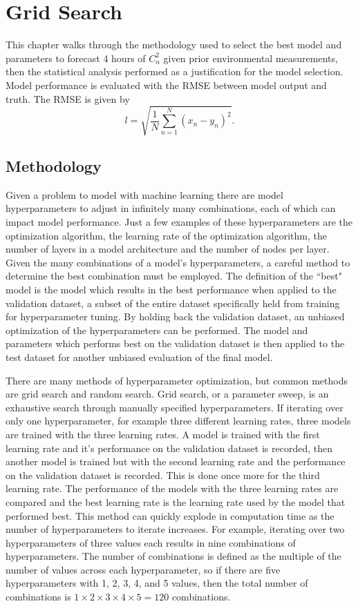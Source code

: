 \chapter{Grid Search}
\label{ch4}
This chapter walks through the methodology used to select the best model and parameters to forecast 4 hours of $C_{n}^{2}$ given prior environmental measurements, then the statistical analysis performed as a justification for the model selection. Model performance is evaluated with the \ac{RMSE} between model output and truth. The \ac{RMSE} is given by
\begin{equation} \label{eq:RMSE}
	l = \sqrt{\frac{1}{N} \sum_{n=1}^{N} \left(x_{n} - y_{n}\right)^{2}}.
\end{equation}

\section{Methodology}
\label{sec:grid_search_methodology}
Given a problem to model with machine learning there are model hyperparameters to adjust in infinitely many combinations, each of which can impact model performance. Just a few examples of these hyperparameters are the optimization algorithm, the learning rate of the optimization algorithm, the number of layers in a model architecture and the number of nodes per layer. Given the many combinations of a model's hyperparameters, a careful method to determine the best combination must be employed. The definition of the ``best" model is the model which results in the best performance when applied to the validation dataset, a subset of the entire dataset specifically held from training for hyperparameter tuning. By holding back the validation dataset, an unbiased optimization of the hyperparameters can be performed. The model and parameters which performs best on the validation dataset is then applied to the test dataset for another unbiased evaluation of the final model.

There are many methods of hyperparameter optimization, but common methods are grid search and random search. Grid search, or a parameter sweep, is an exhaustive search through manually specified hyperparameters. If iterating over only one hyperparameter, for example three different learning rates, three models are trained with the three learning rates. A model is trained with the first learning rate and it's performance on the validation dataset is recorded, then another model is trained but with the second learning rate and the performance on the validation dataset is recorded. This is done once more for the third learning rate. The performance of the models with the three learning rates are compared and the best learning rate is the learning rate used by the model that performed best. This method can quickly explode in computation time as the number of hyperparameters to iterate increases. For example, iterating over two hyperparameters of three values each results in nine combinations of hyperparameters. The number of combinations is defined as the multiple of the number of values across each hyperparameter, so if there are five hyperparameters with 1, 2, 3, 4, and 5 values, then the total number of combinations is $1 \times 2 \times 3 \times 4 \times 5 = 120$ combinations.

